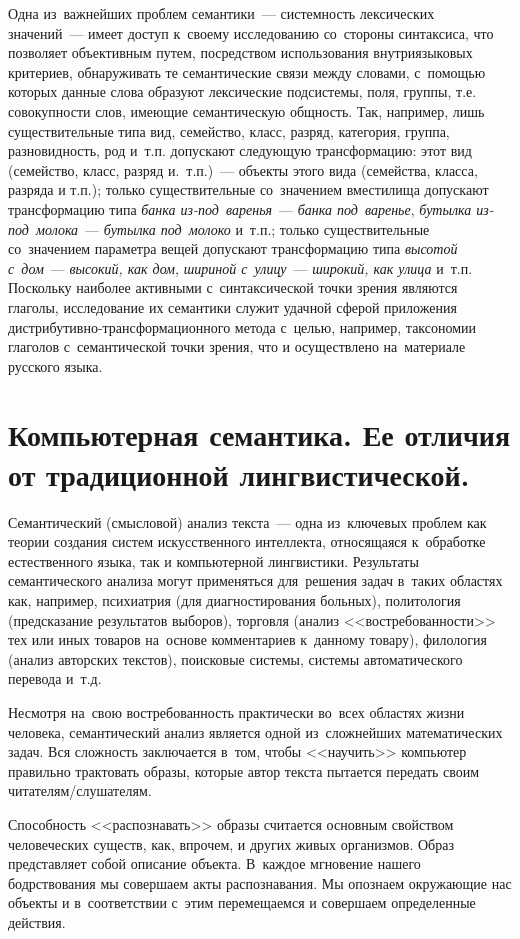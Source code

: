 \documentclass[12pt]{article}
\theoremstyle{definition}
\theoremstyle{remark}
\numberwithin{equation}{section}
\begin{document}
Одна из~важнейших проблем семантики~--- системность лексических значений~---
имеет доступ к~своему исследованию со~стороны синтаксиса, что позволяет
объективным путем, посредством использования внутриязыковых критериев,
обнаруживать те семантические связи между словами, с~помощью которых данные
слова образуют лексические подсистемы, поля, группы, т.е. совокупности
слов, имеющие семантическую общность. Так, например, лишь существительные
типа вид, семейство, класс, разряд, категория, группа, разновидность, род
и~т.п. допускают следующую трансформацию: этот вид (семейство, класс, разряд
и.~т.п.)~--- объекты этого вида (семейства, класса, разряда и т.п.); только
существительные со~значением вместилища допускают трансформацию типа {\it банка
из-под~варенья}~--- {\it банка под~варенье}, {\it бутылка из-под~молока}~---
{\it бутылка под~молоко} и~т.п.; только существительные со~значением параметра вещей
допускают трансформацию типа {\it высотой с~дом}~--- {\it высокий, как дом},
{\it шириной с~улицу}~--- {\it широкий, как улица} и~т.п. Поскольку наиболее
активными с~синтаксической точки зрения являются глаголы, исследование их
семантики служит удачной сферой приложения дистрибутивно-трансформационного
метода с~целью, например, таксономии глаголов с~семантической точки
зрения, что и осуществлено на~материале русского языка.

\section{Компьютерная семантика. Ее отличия от традиционной лингвистической.}
Семантический (смысловой) анализ текста~--- одна из~ключевых проблем
как теории создания систем искусственного интеллекта, относящаяся
к~обработке естественного языка, так и компьютерной лингвистики.
Результаты семантического анализа могут применяться для~решения задач
в~таких областях как, например, психиатрия (для диагностирования
больных), политология (предсказание результатов выборов), торговля
(анализ <<востребованности>> тех или иных товаров на~основе комментариев
к~данному товару), филология (анализ авторских текстов), поисковые
системы, системы автоматического перевода и~т.д.

Несмотря на~свою востребованность практически во~всех областях жизни
человека, семантический анализ является одной из~сложнейших математических
задач. Вся сложность заключается в~том, чтобы <<научить>> компьютер
правильно трактовать образы, которые автор текста пытается передать
своим читателям/слушателям.

Способность <<распознавать>> образы считается основным свойством
человеческих существ, как, впрочем, и других живых организмов.
Образ представляет собой описание объекта. В~каждое мгновение
нашего бодрствования мы совершаем акты распознавания. Мы опознаем
окружающие нас объекты и в~соответствии с~этим перемещаемся и
совершаем определенные действия.
\end{document}
